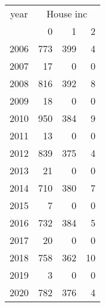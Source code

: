 \footnotesize\begin{tabular}[t]{lrrr}
\toprule
\multicolumn{1}{c}{year} & \multicolumn{3}{c}{House inc} \\
\cmidrule(l{3pt}r{3pt}){1-1} \cmidrule(l{3pt}r{3pt}){2-4}
  & 0 & 1 & 2\\
\midrule
2006 & 773 & 399 & 4\\
2007 & 17 & 0 & 0\\
2008 & 816 & 392 & 8\\
2009 & 18 & 0 & 0\\
2010 & 950 & 384 & 9\\
2011 & 13 & 0 & 0\\
2012 & 839 & 375 & 4\\
2013 & 21 & 0 & 0\\
2014 & 710 & 380 & 7\\
2015 & 7 & 0 & 0\\
2016 & 732 & 384 & 5\\
2017 & 20 & 0 & 0\\
2018 & 758 & 362 & 10\\
2019 & 3 & 0 & 0\\
2020 & 782 & 376 & 4\\
\bottomrule
\end{tabular}
